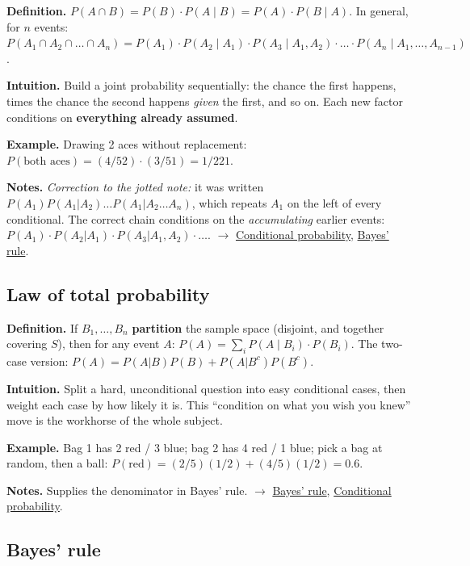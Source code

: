 \documentclass[11pt,a4paper]{article}
\begin{document}
\textbf{Definition.} $P(A \cap  B) = P(B)\cdot P(A \mid B) = P(A)\cdot P(B \mid A)$. In general, for $n$ events:
$P(A_{1} \cap  A_{2} \cap  \ldots  \cap  A_{n}) = P(A_{1})\cdot P(A_{2} \mid A_{1})\cdot P(A_{3} \mid A_{1}, A_{2}) \cdot  \ldots  \cdot  P(A_{n} \mid A_{1}, \ldots , A_{n-1})$.

\textbf{Intuition.} Build a joint probability sequentially: the chance the first happens, times the chance the second happens \textit{given} the first, and so on. Each new factor conditions on \textbf{everything already assumed}.

\textbf{Example.} Drawing 2 aces without replacement: $P(\text{both aces}) = (4/52)\cdot (3/51) = 1/221$.

\textbf{Notes.} \textit{Correction to the jotted note:} it was written $P(A_{1})P(A_{1}|A_{2})\ldots P(A_{1}|A_{2}\ldots A_{n})$, which repeats $A_{1}$ on the left of every conditional. The correct chain conditions on the \textit{accumulating} earlier events: $P(A_{1})\cdot P(A_{2}|A_{1})\cdot P(A_{3}|A_{1},A_{2})\cdot \ldots$. $\to$ \hyperref[sec:conditional-probability]{Conditional probability}, \hyperref[sec:bayes-rule]{Bayes' rule}.

\subsection{Law of total probability}\label{sec:law-of-total-probability}

\textbf{Definition.} If $B_{1}, \ldots , B_{n}$ \textbf{partition} the sample space (disjoint, and together covering $S$), then for any event $A$:
$P(A) = \sum _{i} P(A \mid B_{i})\cdot P(B_{i})$. The two-case version: $P(A) = P(A|B)P(B) + P(A|B^{c})P(B^{c})$.

\textbf{Intuition.} Split a hard, unconditional question into easy conditional cases, then weight each case by how likely it is. This ``condition on what you wish you knew'' move is the workhorse of the whole subject.

\textbf{Example.} Bag 1 has 2 red / 3 blue; bag 2 has 4 red / 1 blue; pick a bag at random, then a ball:
$P(\text{red}) = (2/5)(1/2) + (4/5)(1/2) = 0.6$.

\textbf{Notes.} Supplies the denominator in Bayes' rule. $\to$ \hyperref[sec:bayes-rule]{Bayes' rule}, \hyperref[sec:conditional-probability]{Conditional probability}.

\subsection{Bayes' rule}\label{sec:bayes-rule}
\end{document}

